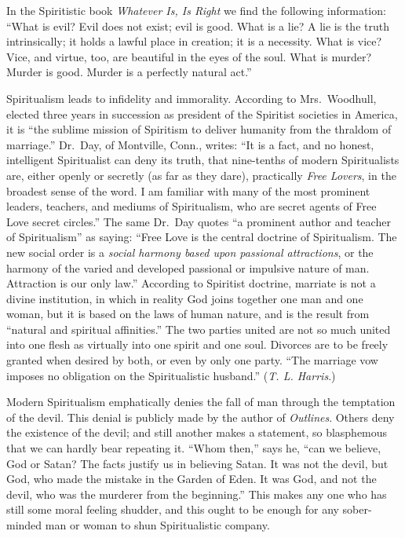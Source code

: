 \documentclass[
]{book}
\begin{document}
In the Spiritistic book \emph{Whatever Is, Is Right} we find the following information: ``What is evil? Evil does not exist; evil is good. What is a lie? A lie is the truth intrinsically; it holds a lawful place in creation; it is a necessity. What is vice? Vice, and virtue, too, are beautiful in the eyes of the soul. What is murder? Murder is good. Murder is a perfectly natural act.''

Spiritualism leads to infidelity and immorality. According to Mrs.~Woodhull, elected three years in succession as president of the Spiritist societies in America, it is ``the sublime mission of Spiritism to deliver humanity from the thraldom of marriage.'' Dr.~Day, of Montville, Conn., writes: ``It is a fact, and no honest, intelligent Spiritualist can deny its truth, that nine-tenths of modern Spiritualists are, either openly or secretly (as far as they dare), practically \emph{Free Lovers}, in the broadest sense of the word. I am familiar with many of the most prominent leaders, teachers, and mediums of Spiritualism, who are secret agents of Free Love secret circles.'' The same Dr.~Day quotes ``a prominent author and teacher of Spiritualism'' as saying: ``Free Love is the central doctrine of Spiritualism. The new social order is a \emph{social harmony based upon passional attractions}, or the harmony of the varied and developed passional or impulsive nature of man. Attraction is our only law.'' According to Spiritist doctrine, marriate is not a divine institution, in which in reality God joins together one man and one woman, but it is based on the laws of human nature, and is the result from ``natural and spiritual affinities.'' The two parties united are not so much united into one flesh as virtually into one spirit and one soul. Divorces are to be freely granted when desired by both, or even by only one party. ``The marriage vow imposes no obligation on the Spiritualistic husband.'' (\emph{T. L. Harris}.)

Modern Spiritualism emphatically denies the fall of man through the temptation of the devil. This denial is publicly made by the author of \emph{Outlines}. Others deny the existence of the devil; and still another makes a statement, so blasphemous that we can hardly bear repeating it. ``Whom then,'' says he, ``can we believe, God or Satan? The facts justify us in believing Satan. It was not the devil, but God, who made the mistake in the Garden of Eden. It was God, and not the devil, who was the murderer from the beginning.'' This makes any one who has still some moral feeling shudder, and this ought to be enough for any sober-minded man or woman to shun Spiritualistic company.
\end{document}
